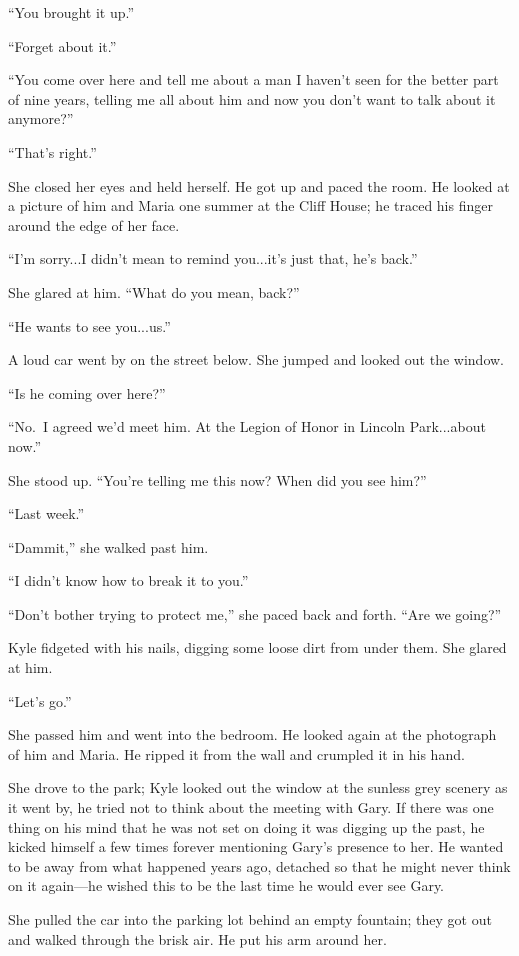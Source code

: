 \documentclass[
]{article}
\begin{document}
``You brought it up.''

``Forget about it.''

``You come over here and tell me about a man I haven't seen for the
better part of nine years, telling me all about him and now you don't
want to talk about it anymore?''

``That's right.''

She closed her eyes and held herself. He got up and paced the room. He
looked at a picture of him and Maria one summer at the Cliff House; he
traced his finger around the edge of her face.

``I'm sorry...I didn't mean to remind you...it's just that, he's back.''

She glared at him. ``What do you mean, back?''

``He wants to see you...us.''

A loud car went by on the street below. She jumped and looked out the
window.

``Is he coming over here?''

``No.~I agreed we'd meet him. At the Legion of Honor in Lincoln
Park...about now.''

She stood up. ``You're telling me this now? When did you see him?''

``Last week.''

``Dammit,'' she walked past him.

``I didn't know how to break it to you.''

``Don't bother trying to protect me,'' she paced back and forth. ``Are
we going?''

Kyle fidgeted with his nails, digging some loose dirt from under them.
She glared at him.

``Let's go.''

She passed him and went into the bedroom. He looked again at the
photograph of him and Maria. He ripped it from the wall and crumpled it
in his hand.

She drove to the park; Kyle looked out the window at the sunless grey
scenery as it went by, he tried not to think about the meeting with
Gary. If there was one thing on his mind that he was not set on doing it
was digging up the past, he kicked himself a few times forever
mentioning Gary's presence to her. He wanted to be away from what
happened years ago, detached so that he might never think on it
again---he wished this to be the last time he would ever see Gary.

She pulled the car into the parking lot behind an empty fountain; they
got out and walked through the brisk air. He put his arm around her.
\end{document}
